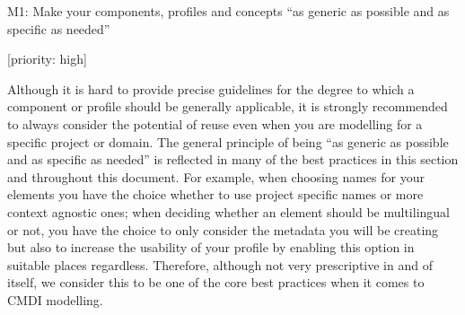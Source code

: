 M1: Make your components, profiles and concepts ``as generic as possible
and as specific as needed''

{[}priority: high{]}

Although it is hard to provide precise guidelines for the degree to
which a component or profile should be generally applicable, it is
strongly recommended to always consider the potential of reuse even when
you are modelling for a specific project or domain. The general
principle of being ``as generic as possible and as specific as needed''
is reflected in many of the best practices in this section and
throughout this document. For example, when choosing names for your
elements you have the choice whether to use project specific names or
more context agnostic ones; when deciding whether an element should be
multilingual or not, you have the choice to only consider the metadata
you will be creating but also to increase the usability of your profile
by enabling this option in suitable places regardless. Therefore,
although not very prescriptive in and of itself, we consider this to be
one of the core best practices when it comes to CMDI modelling.
